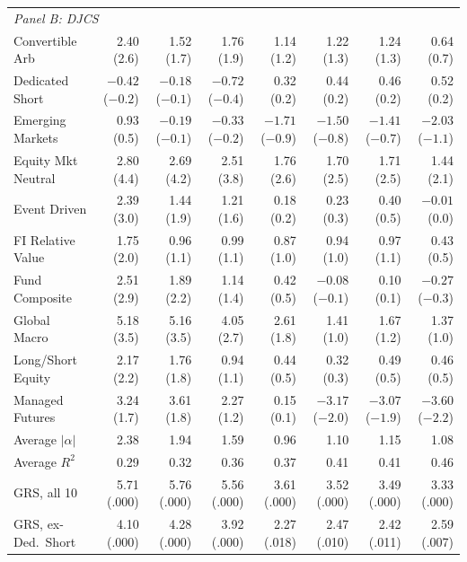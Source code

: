 \documentclass[11pt]{article}
\begin{document}
\begin{table}[H]
{\begin{tabular}{lrrrrrrr}
\midrule
\multicolumn{8}{l}{\emph{Panel B: DJCS}}\\
Convertible Arb   & 2.40 (2.6) & 1.52 (1.7) & 1.76 (1.9) & 1.14 (1.2) & 1.22 (1.3) & 1.24 (1.3) & 0.64 (0.7)\\
Dedicated Short   & $-0.42$ ($-0.2$) & $-0.18$ ($-0.1$) & $-0.72$ ($-0.4$) & 0.32 (0.2) & 0.44 (0.2) & 0.46 (0.2) & 0.52 (0.2)\\
Emerging Markets  & 0.93 (0.5) & $-0.19$ ($-0.1$) & $-0.33$ ($-0.2$) & $-1.71$ ($-0.9$) & $-1.50$ ($-0.8$) & $-1.41$ ($-0.7$) & $-2.03$ ($-1.1$)\\
Equity Mkt Neutral& 2.80 (4.4) & 2.69 (4.2) & 2.51 (3.8) & 1.76 (2.6) & 1.70 (2.5) & 1.71 (2.5) & 1.44 (2.1)\\
Event Driven      & 2.39 (3.0) & 1.44 (1.9) & 1.21 (1.6) & 0.18 (0.2) & 0.23 (0.3) & 0.40 (0.5) & $-0.01$ (0.0)\\
FI Relative Value & 1.75 (2.0) & 0.96 (1.1) & 0.99 (1.1) & 0.87 (1.0) & 0.94 (1.0) & 0.97 (1.1) & 0.43 (0.5)\\
Fund Composite    & 2.51 (2.9) & 1.89 (2.2) & 1.14 (1.4) & 0.42 (0.5) & $-0.08$ ($-0.1$) & 0.10 (0.1) & $-0.27$ ($-0.3$)\\
Global Macro      & 5.18 (3.5) & 5.16 (3.5) & 4.05 (2.7) & 2.61 (1.8) & 1.41 (1.0) & 1.67 (1.2) & 1.37 (1.0)\\
Long/Short Equity & 2.17 (2.2) & 1.76 (1.8) & 0.94 (1.1) & 0.44 (0.5) & 0.32 (0.3) & 0.49 (0.5) & 0.46 (0.5)\\
Managed Futures   & 3.24 (1.7) & 3.61 (1.8) & 2.27 (1.2) & 0.15 (0.1) & $-3.17$ ($-2.0$) & $-3.07$ ($-1.9$) & $-3.60$ ($-2.2$)\\
\addlinespace
Average $|\alpha|$ & 2.38 & 1.94 & 1.59 & 0.96 & 1.10 & 1.15 & 1.08\\
Average $R^2$      & 0.29 & 0.32 & 0.36 & 0.37 & 0.41 & 0.41 & 0.46\\
GRS, all 10        & 5.71 (.000) & 5.76 (.000) & 5.56 (.000) & 3.61 (.000) & 3.52 (.000) & 3.49 (.000) & 3.33 (.000)\\
GRS, ex-Ded.\ Short & 4.10 (.000) & 4.28 (.000) & 3.92 (.000) & 2.27 (.018) & 2.47 (.010) & 2.42 (.011) & 2.59 (.007)\\
\bottomrule
\end{tabular}}
\end{table}
\end{document}
